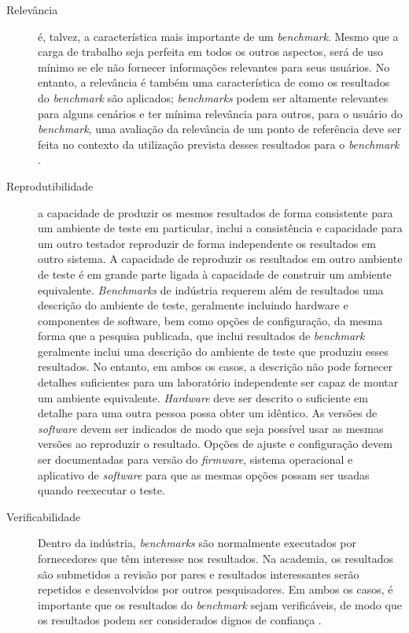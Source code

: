 \begin{description}
	\item[Relevância] é, talvez, a característica mais importante de um \textit{benchmark}. Mesmo que a carga de trabalho seja perfeita em todos os outros aspectos, será de uso mínimo se ele não fornecer informações relevantes para seus usuários. No entanto, a relevância é também uma característica de como os resultados do \textit{benchmark} são aplicados; \textit{benchmarks} podem ser altamente relevantes para alguns cenários e ter mínima relevância para outros, para o usuário do \textit{benchmark}, uma avaliação da relevância de um ponto de referência deve ser feita no contexto da utilização prevista desses resultados para o \textit{benchmark} \cite{Kistowski2015}. 
	
	\item[Reprodutibilidade] a capacidade de produzir os mesmos resultados de forma consistente para um ambiente de teste em particular, inclui a consistência e capacidade para um outro testador reproduzir de forma independente os resultados em outro sistema. A capacidade de reproduzir os resultados em outro ambiente de teste é em grande parte ligada à capacidade de construir um ambiente equivalente. \textit{Benchmarks} de indústria requerem além de resultados uma descrição do ambiente de teste, geralmente incluindo hardware e componentes de software, bem como opções de configuração, da mesma forma que a pesquisa publicada, que inclui resultados de \textit{benchmark} geralmente inclui uma descrição do ambiente de teste que produziu esses resultados. No entanto, em ambos os casos, a descrição não pode fornecer detalhes suficientes para um laboratório independente ser capaz de montar um ambiente equivalente. \textit{Hardware} deve ser descrito o suficiente em detalhe para uma outra pessoa possa obter um idêntico. As versões de \textit{software} devem ser indicados de modo que seja possível usar as mesmas versões ao reproduzir o resultado. Opções de ajuste e configuração devem ser documentadas para versão do \textit{firmware}, sistema operacional e aplicativo de \textit{software} para que as mesmas opções possam ser usadas quando reexecutar o teste. \cite{Kistowski2015}
	
	\item[Verificabilidade] Dentro da indústria, \textit{benchmarks} são normalmente executados por fornecedores que têm interesse nos resultados. Na academia, os resultados são submetidos a revisão por pares e resultados interessantes serão repetidos e desenvolvidos por outros pesquisadores. Em ambos os casos, é importante que os resultados do \textit{benchmark} sejam verificáveis, de modo que os resultados podem ser considerados dignos de confiança \cite{Kistowski2015}. 
	

\end{description}
